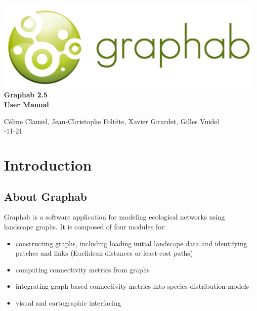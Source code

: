 \documentclass{article}
\begin{document}
\begin{titlepage}

	\centering
	\includegraphics[scale=0.5]{img/logo.png}\\
	
	\bigskip
	\bigskip
	\bigskip	
	{\Huge
	\bfseries
	Graphab 2.5\\
	\bigskip
	User Manual\\
	}
	\bigskip
	\bigskip
	\bigskip
	\bigskip
	\bigskip
			
	{\Large		
	Céline Clauzel, Jean-Christophe Foltête, Xavier Girardet, Gilles Vuidel\\
	-11-21\\
	}
	
\end{titlepage}

\setcounter{tocdepth}{2}
\tableofcontents

\pagebreak

\section{Introduction}

\subsection{About Graphab}

Graphab is a software application for modeling ecological networks using landscape graphs. It is composed of four modules for:
\begin{itemize}
	\item constructing graphs, including loading initial landscape data and identifying patches and links (Euclidean distances or least-cost paths)
	\item computing connectivity metrics from graphs
	\item integrating graph-based connectivity metrics into species distribution models
	\item visual and cartographic interfacing 
\end{itemize}
\end{document}
